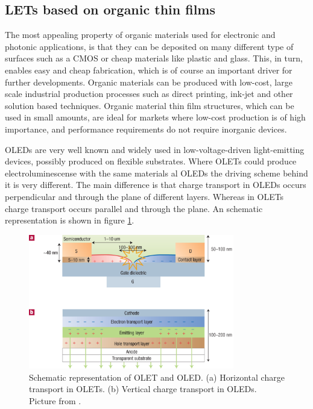 \subsection{LETs based on organic thin films}\label{sec:thinfilms} %
The most appealing property of organic materials used for electronic and photonic applications, is that they can be deposited on many different type of surfaces such as a CMOS or cheap materials like plastic and glass. This, in turn, enables easy and cheap fabrication, which is of course an important driver for further developments. Organic materials can be produced with low-cost, large scale industrial production processes such as direct printing, ink-jet and other solution based techniques. Organic material thin film structures, which can be used in small amounts, are ideal for markets where low-cost production is of high importance, and performance requirements  do not require inorganic devices.

OLEDs are very well known and widely used in low-voltage-driven light-emitting devices, possibly produced on flexible substrates. Where OLETs could produce electroluminescense with the same materials al OLEDs the driving scheme behind it is very different. The main difference is that charge transport in OLEDs occurs perpendicular and through the plane of different layers. Whereas in OLETs charge transport occurs parallel and through the plane. An schematic representation is shown in figure \ref{fig:thinfilms}.

\begin{figure}[!ht]
 \begin{center}
  \includegraphics[width=0.8\textwidth]{fig_2}
  \caption{Schematic representation of OLET and OLED. (a) Horizontal charge transport in OLETs. (b) Vertical charge transport in OLEDs. Picture from \citet{Muccini}.}
  \label{fig:thinfilms}
 \end{center}
\end{figure}

